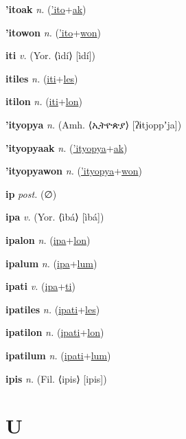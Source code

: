 \textbf{\hypertarget{'itoak}{'itoak}} \textit{n.} (\hyperlink{'ito}{'ito}+\allowbreak \hyperlink{ak}{ak})


\textbf{\hypertarget{'itowon}{'itowon}} \textit{n.} (\hyperlink{'ito}{'ito}+\allowbreak \hyperlink{won}{won})


\textbf{\hypertarget{iti}{iti}} \textit{v.} (Yor. ⟨ìdí⟩ [ìdí])


\textbf{\hypertarget{itiles}{itiles}} \textit{n.} (\hyperlink{iti}{iti}+\allowbreak \hyperlink{les}{les})


\textbf{\hypertarget{itilon}{itilon}} \textit{n.} (\hyperlink{iti}{iti}+\allowbreak \hyperlink{lon}{lon})


\textbf{\hypertarget{'ityopya}{'ityopya}} \textit{n.} (Amh. ⟨{\ethiopic{}ኢትዮጵያ}⟩ [ʔɨtjoppʼja])


\textbf{\hypertarget{'ityopyaak}{'ityopyaak}} \textit{n.} (\hyperlink{'ityopya}{'ityopya}+\allowbreak \hyperlink{ak}{ak})


\textbf{\hypertarget{'ityopyawon}{'ityopyawon}} \textit{n.} (\hyperlink{'ityopya}{'ityopya}+\allowbreak \hyperlink{won}{won})


\textbf{\hypertarget{ip}{ip}} \textit{post.} (∅)


\textbf{\hypertarget{ipa}{ipa}} \textit{v.} (Yor. ⟨ìbá⟩ [ìbá])


\textbf{\hypertarget{ipalon}{ipalon}} \textit{n.} (\hyperlink{ipa}{ipa}+\allowbreak \hyperlink{lon}{lon})


\textbf{\hypertarget{ipalum}{ipalum}} \textit{n.} (\hyperlink{ipa}{ipa}+\allowbreak \hyperlink{lum}{lum})


\textbf{\hypertarget{ipati}{ipati}} \textit{v.} (\hyperlink{ipa}{ipa}+\allowbreak \hyperlink{ti}{ti})


\textbf{\hypertarget{ipatiles}{ipatiles}} \textit{n.} (\hyperlink{ipati}{ipati}+\allowbreak \hyperlink{les}{les})


\textbf{\hypertarget{ipatilon}{ipatilon}} \textit{n.} (\hyperlink{ipati}{ipati}+\allowbreak \hyperlink{lon}{lon})


\textbf{\hypertarget{ipatilum}{ipatilum}} \textit{n.} (\hyperlink{ipati}{ipati}+\allowbreak \hyperlink{lum}{lum})


\textbf{\hypertarget{ipis}{ipis}} \textit{n.} (Fil. ⟨ipis⟩ [ipis])


\section{U}

